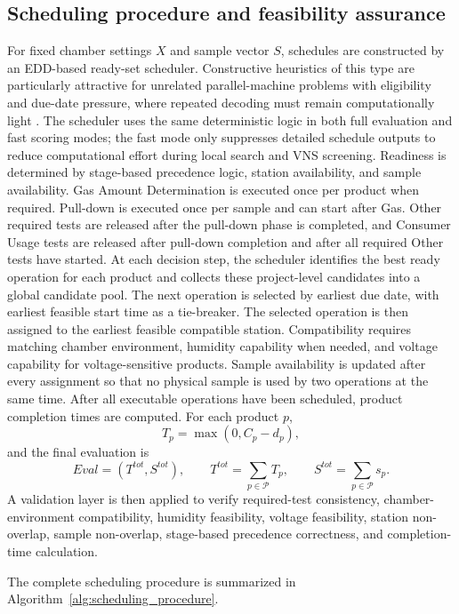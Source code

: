 \documentclass[11pt]{article}
\begin{document}
\subsection{Scheduling procedure and feasibility assurance}
\label{subsec:scheduling_procedure}
For fixed chamber settings \(X\) and sample vector \(S\), schedules are constructed by an EDD-based ready-set scheduler.
Constructive heuristics of this type are particularly attractive for
unrelated parallel-machine problems with eligibility and due-date pressure,
where repeated decoding must remain computationally light
\cite{PerezGonzalezFernandezViagasZamoraGarciaFraminan2019,WangHeKerkhoveVanhoucke2017}.
The scheduler uses the same deterministic logic in both full evaluation and fast scoring modes; the fast mode only suppresses detailed schedule outputs to reduce computational effort during local search and VNS screening.
Readiness is determined by stage-based precedence logic, station availability, and sample availability. Gas Amount Determination is executed once per product when required. Pull-down is executed once per sample and can start after Gas. Other required tests are released after the pull-down phase is completed, and Consumer Usage tests are released after pull-down completion and after all required Other tests have started.
At each decision step, the scheduler identifies the best ready operation for each product and collects these project-level candidates into a global candidate pool. The next operation is selected by earliest due date, with earliest feasible start time as a tie-breaker. The selected operation is then assigned to the earliest feasible compatible station. Compatibility requires matching chamber environment, humidity capability when needed, and voltage capability for voltage-sensitive products. Sample availability is updated after every assignment so that no physical sample is used by two operations at the same time.
After all executable operations have been scheduled, product completion times are computed. For each product \(p\),
\[
T_p=\max(0,C_p-d_p),
\]
and the final evaluation is
\[
Eval=(T^{tot},S^{tot}),
\qquad
T^{tot}=\sum_{p\in\mathcal{P}}T_p,
\qquad
S^{tot}=\sum_{p\in\mathcal{P}}s_p.
\]
A validation layer is then applied to verify required-test consistency, chamber-environment compatibility, humidity feasibility, voltage feasibility, station non-overlap, sample non-overlap, stage-based precedence correctness, and completion-time calculation.

The complete scheduling procedure is summarized in Algorithm~\ref{alg:scheduling_procedure}.
\end{document}
